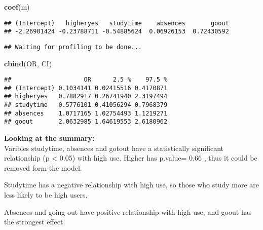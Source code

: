 \documentclass[]{article}
\newenvironment{Shaded}{\begin{snugshade}}{\end{snugshade}}
\newcommand{\KeywordTok}[1]{\textcolor[rgb]{0.13,0.29,0.53}{\textbf{#1}}}
\newcommand{\StringTok}[1]{\textcolor[rgb]{0.31,0.60,0.02}{#1}}
\newcommand{\OperatorTok}[1]{\textcolor[rgb]{0.81,0.36,0.00}{\textbf{#1}}}
\newcommand{\NormalTok}[1]{#1}
\begin{document}
\begin{Shaded}
\begin{Highlighting}[]
\KeywordTok{coef}\NormalTok{(m)}
\end{Highlighting}
\end{Shaded}

\begin{verbatim}
## (Intercept)   higheryes   studytime    absences       goout 
## -2.26901424 -0.23788711 -0.54885624  0.06926153  0.72430592
\end{verbatim}

\begin{Shaded}
\end{Shaded}

\begin{verbatim}
## Waiting for profiling to be done...
\end{verbatim}

\begin{Shaded}
\begin{Highlighting}[]
\KeywordTok{cbind}\NormalTok{(OR, CI)}
\end{Highlighting}
\end{Shaded}

\begin{verbatim}
##                    OR      2.5 %    97.5 %
## (Intercept) 0.1034141 0.02415516 0.4170871
## higheryes   0.7882917 0.26741940 2.3197494
## studytime   0.5776101 0.41056294 0.7968379
## absences    1.0717165 1.02754493 1.1219271
## goout       2.0632985 1.64619553 2.6180962
\end{verbatim}

\textbf{Looking at the summary:}\\
Varibles studytime, absences and gotout have a statistically significant
relationship (p \textless{} 0.05) with high use. Higher has p.value=
0.66 , thus it could be removed form the model.

Studytime has a negative relationship with high use, so those who study
more are less likely to be high users.

Absences and going out have positive relationship with high use, and
goout has the strongest effect.
\end{document}
